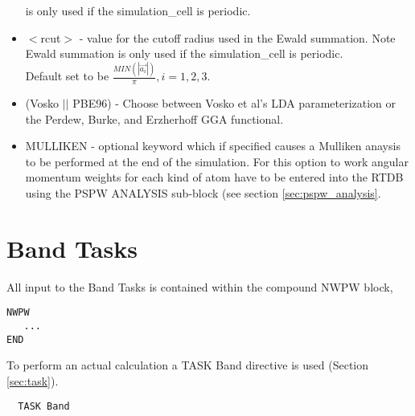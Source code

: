 \begin{itemize}
                          is only used if the simulation\_cell is periodic.
        \item $<$rcut$>$ - value for the cutoff radius used
                          in the Ewald summation. Note Ewald summation
                          is only used if the simulation\_cell is periodic. \\
                           Default set to be
                          $\frac{MIN(\left| \vec{a_i} \right|)}{\pi}, i=1,2,3$.
        \item (Vosko $||$ PBE96) - Choose between Vosko et al's LDA 
                               parameterization or the Perdew, Burke, 
                               and Erzherhoff GGA functional.
        \item MULLIKEN - optional keyword which if specified
                         causes a Mulliken anaysis to be performed at
                         the end of the simulation.  For this option
                         to work angular momentum weights for each kind
                         of atom have to be entered into the RTDB using
                         the PSPW ANALYSIS sub-block (see section \ref{sec:pspw_analysis}.
\end{itemize}



\section{Band Tasks}
\label{sec:band_tasks}

All input to the Band Tasks is contained within the compound NWPW block,
\begin{verbatim}
NWPW
   ...
END
\end{verbatim}

To perform an actual calculation a TASK Band directive is used (Section \ref{sec:task}).  
\begin{verbatim}
  TASK Band
\end{verbatim} 

